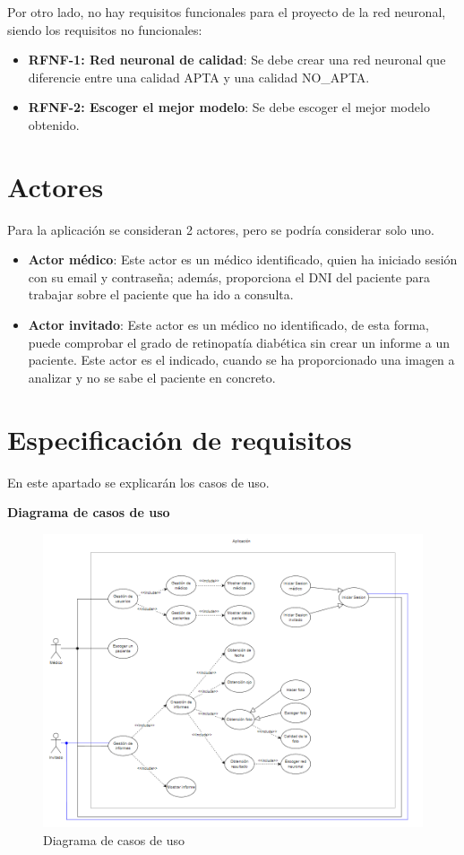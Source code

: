 Por otro lado, no hay requisitos funcionales para el proyecto de la red neuronal, siendo los requisitos no funcionales:
\begin{itemize}
    \item \textbf{RFNF-1: Red neuronal de calidad}: Se debe crear una red neuronal que diferencie entre una calidad APTA y una calidad NO\_APTA.
    \item \textbf{RFNF-2: Escoger el mejor modelo}: Se debe escoger el mejor modelo obtenido.
\end{itemize}
\section{Actores}
Para la aplicación se consideran 2 actores, pero se podría considerar solo uno.
\begin{itemize}
    \item \textbf{Actor médico}: Este actor es un médico identificado, quien ha iniciado sesión con su email y contraseña; además, proporciona el DNI del paciente para trabajar sobre el paciente que ha ido a consulta.
    \item \textbf{Actor invitado}: Este actor es un médico no identificado, de esta forma, puede comprobar el grado de retinopatía diabética sin crear un informe a un paciente. Este actor es el indicado, cuando se ha proporcionado una imagen a analizar y no se sabe el paciente en concreto.
\end{itemize}


\section{Especificación de requisitos}

En este apartado se explicarán los casos de uso.


\begin{landscape}
\textbf{Diagrama de casos de uso}
\begin{figure}[!ht]
         \centering
         \includegraphics[height=0.8\textheight]{img/Diagrama de casos de uso.png}
         \caption{Diagrama de casos de uso}
         \label{fig:Diagrama de casos de uso}
\end{figure}
\end{landscape}

